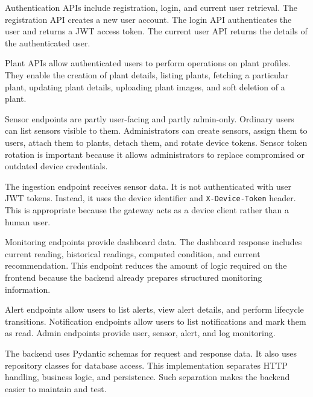Authentication APIs include registration, login, and current user retrieval. The registration API creates a new user account. The login API authenticates the user and returns a JWT access token. The current user API returns the details of the authenticated user.

Plant APIs allow authenticated users to perform operations on plant profiles. They enable the creation of plant details, listing plants, fetching a particular plant, updating plant details, uploading plant images, and soft deletion of a plant.

Sensor endpoints are partly user-facing and partly admin-only. Ordinary users can list sensors visible to them. Administrators can create sensors, assign them to users, attach them to plants, detach them, and rotate device tokens. Sensor token rotation is important because it allows administrators to replace compromised or outdated device credentials.

The ingestion endpoint receives sensor data. It is not authenticated with user JWT tokens. Instead, it uses the device identifier and \texttt{X-Device-Token} header. This is appropriate because the gateway acts as a device client rather than a human user.

Monitoring endpoints provide dashboard data. The dashboard response includes current reading, historical readings, computed condition, and current recommendation. This endpoint reduces the amount of logic required on the frontend because the backend already prepares structured monitoring information.

Alert endpoints allow users to list alerts, view alert details, and perform lifecycle transitions. Notification endpoints allow users to list notifications and mark them as read. Admin endpoints provide user, sensor, alert, and log monitoring.

The backend uses Pydantic schemas for request and response data. It also uses repository classes for database access. This implementation separates HTTP handling, business logic, and persistence. Such separation makes the backend easier to maintain and test.


